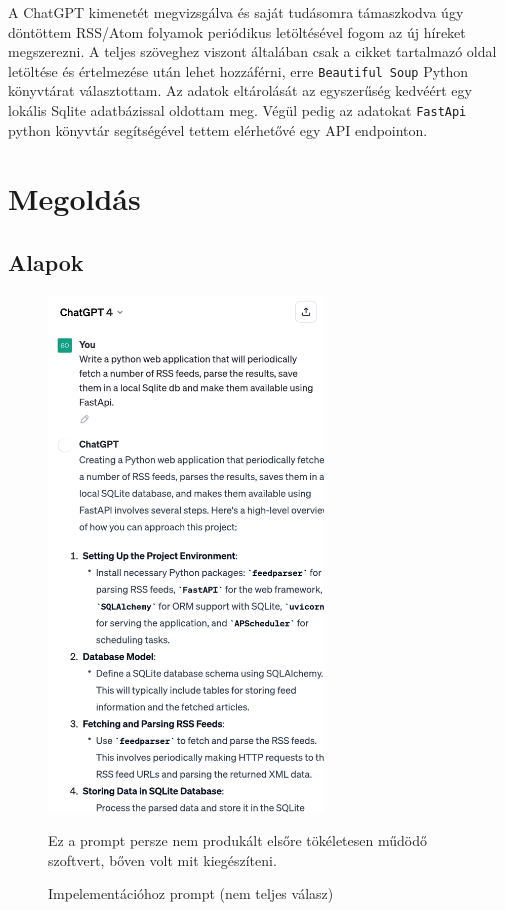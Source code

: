 \documentclass[]{article}
\begin{document}
A ChatGPT kimenetét megvizsgálva és saját tudásomra támaszkodva úgy döntöttem RSS/Atom folyamok periódikus letöltésével fogom az új híreket megszerezni. A teljes szöveghez viszont általában csak a cikket tartalmazó oldal letöltése és értelmezése után lehet hozzáférni, erre \texttt{Beautiful Soup} Python könyvtárat választottam. Az adatok eltárolását az egyszerűség kedvéért egy lokális Sqlite adatbázissal oldottam meg. Végül pedig az adatokat \texttt{FastApi} python könyvtár segítségével tettem elérhetővé egy API endpointon.

\section{Megoldás}

\subsection{Alapok}

\begin{figure}[H]
	\centering
	\includegraphics[width=0.65\textwidth]{prompt_2.pdf}
	\caption{Impelementációhoz prompt (nem teljes válasz)}{Ez a prompt persze nem produkált elsőre tökéletesen műdödő szoftvert, bőven volt mit kiegészíteni.}
\end{figure}
\end{document}
